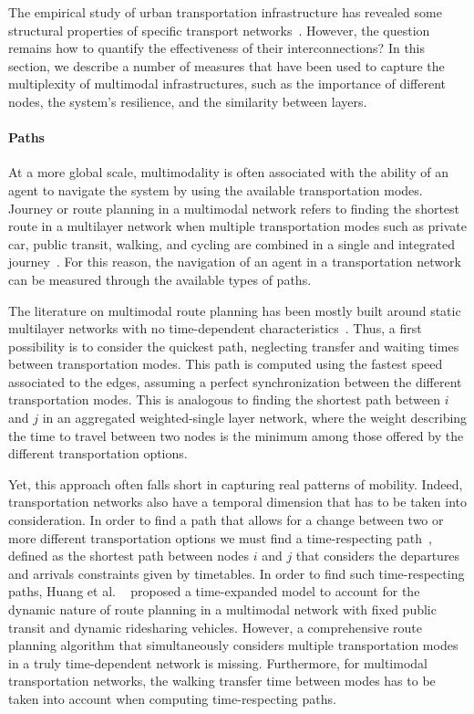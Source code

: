 The empirical study of urban transportation infrastructure has revealed some structural properties of specific transport networks~\cite{barthelemy2011spatial}. However, the question remains how to quantify the effectiveness of their interconnections? In this section, we describe a number of measures that have been used to capture the multiplexity of multimodal infrastructures, such as the importance of different nodes, the system's resilience, and the similarity between layers.

\paragraph*{Paths} 
At a more global scale, multimodality is often associated with the ability of an agent to navigate the system by using the available transportation modes. Journey or route planning in a multimodal network refers to finding the shortest route in a multilayer network when multiple transportation modes such as private car, public transit, walking, and cycling are combined in a single and integrated journey~\cite{zografos2008algorithms,botea2013multi}. For this reason, the navigation of an agent in a transportation network can be measured through the available types of paths.

The literature on multimodal route planning has been mostly built around static multilayer networks with no time-dependent characteristics~\cite{bast2016route}. Thus, a first possibility is to consider the quickest path, neglecting transfer and waiting times between transportation modes. This path is computed using the fastest speed associated to the edges, assuming a perfect synchronization between the different transportation modes. This is analogous to finding the shortest path between $i$ and $j$ in an aggregated weighted-single layer network, where the weight describing the time to travel between two nodes is the minimum among those offered by the different transportation options.

Yet, this approach often falls short in capturing real patterns of mobility. Indeed, transportation networks also have a temporal dimension that has to be taken into consideration. In order to find a path that allows for a change between two or more different transportation options we must find a time-respecting path~\cite{Gallotti2014Efficiency}, defined as the shortest path between nodes $i$ and $j$ that considers the departures and arrivals constraints given by timetables. In order to find such time-respecting paths, Huang et al. ~\cite{huang2019route} proposed a time-expanded model to account for the dynamic nature of route planning in a multimodal network with fixed public transit and dynamic ridesharing vehicles. However, a comprehensive route planning algorithm that simultaneously considers multiple transportation modes in a truly time-dependent network is missing. Furthermore, for multimodal transportation networks, the walking transfer time between modes has to be taken into account when computing time-respecting paths. 

